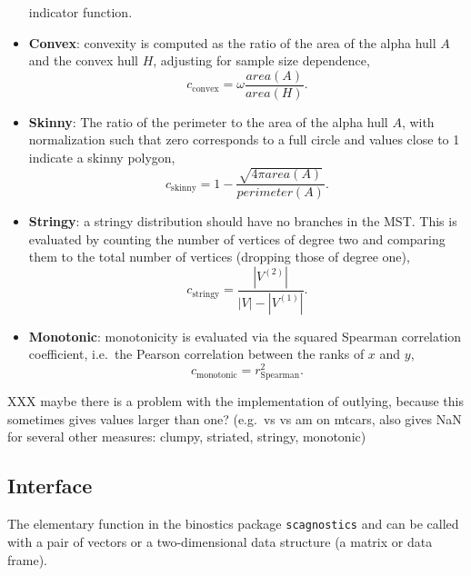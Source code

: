 \begin{itemize}
  indicator function.
\item
  \textbf{Convex}: convexity is computed as the ratio of the area of the
  alpha hull \(A\) and the convex hull \(H\), adjusting for sample size
  dependence, \begin{equation}
  c_{\mathrm{convex}} = \omega \frac{area(A)}{area(H)}.
  \end{equation}
\item
  \textbf{Skinny}: The ratio of the perimeter to the area of the alpha
  hull \(A\), with normalization such that zero corresponds to a full
  circle and values close to 1 indicate a skinny polygon,
  \begin{equation}
  c_{\mathrm{skinny}} = 1 -  \frac{\sqrt{4\pi area(A)}}{perimeter(A)}.
  \end{equation}
\item
  \textbf{Stringy}: a stringy distribution should have no branches in
  the MST. This is evaluated by counting the number of vertices of
  degree two and comparing them to the total number of vertices
  (dropping those of degree one), \begin{equation}
  c_{\mathrm{stringy}} = \frac{|V^{(2)}|}{|V| - |V^{(1)}|}.
  \end{equation}
\item
  \textbf{Monotonic}: monotonicity is evaluated via the squared Spearman
  correlation coefficient, i.e.~the Pearson correlation between the
  ranks of \(x\) and \(y\), \begin{equation}
  c_{\mathrm{monotonic}} = r_{\mathrm{Spearman}}^2.
  \end{equation}
\end{itemize}

XXX maybe there is a problem with the implementation of outlying,
because this sometimes gives values larger than one? (e.g.~vs vs am on
mtcars, also gives NaN for several other measures: clumpy, striated,
stringy, monotonic)

\hypertarget{interface}{%
\subsection{Interface}\label{interface}}

The elementary function in the binostics package \texttt{scagnostics}
and can be called with a pair of vectors or a two-dimensional data
structure (a matrix or data frame).

